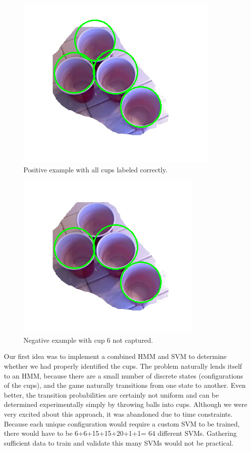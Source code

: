 \documentclass[letterpaper, 10 pt, conference]{ieeeconf}  %
\begin{document}
\begin{figure}[thpb]
      \centering
	  \includegraphics[scale =0.5]{4_cups}
      \caption{Positive example with all cups labeled correctly.}
      \label{fig:positive}
\end{figure}

\begin{figure}[thpb]
      \centering
	  \includegraphics[scale =0.5]{4_cups_bad}
      \caption{Negative example with cup 6 not captured.}
      \label{fig:negative}
\end{figure}

Our first idea was to implement a combined HMM and SVM to determine whether we had properly identified the cups.  The problem naturally lends itself to an HMM, because there are a small number of discrete states (configurations of the cups), and the game naturally transitions from one state to another.  Even better, the transition probabilities are certainly not uniform and can be determined experimentally simply by throwing balls into cups.  Although we were very excited about this approach, it was abandoned due to time constraints.  Because each unique configuration would require a custom SVM to be trained, there would have to be 6+6+15+15+20+1+1= 64 different SVMs.  Gathering sufficient data to train and validate this many SVMs would not be practical.
\end{document}
